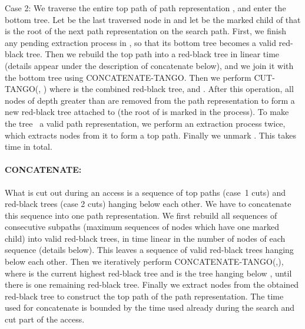 \documentclass[letterpaper,11pt]{article}
\newcommand{\toppath}{top path}
\newcommand{\bottomtree}{bottom tree}
\newcounter{todo}
\newcommand{\todo}[1]{}
\begin{document}
Case 2: We traverse the entire \toppath{} of path representation , and
enter the \bottomtree{}. Let  be the last traversed node in  and let
 be the marked child of  that is the root of the next path
representation on the search path. First, we finish any pending extraction
process in , so that its \bottomtree{} becomes a valid red-black
tree.\todo{This could move  onto the top path, which does not seem
anticipated by the existing phrasing. Hence the changed phrasing. Has
implications for concatenate, see Todo below. Rolf.} Then we rebuild the
\toppath{} into a red-black tree in linear time (details appear under the
description of concatenate below), and we join it with the \bottomtree{}
using C{\scriptsize ONCATENATE}-T{\scriptsize ANGO}.  Then we perform
C{\scriptsize UT}-T{\scriptsize ANGO}(, ) where  is the combined
red-black tree, and . After this operation, all nodes of depth
greater than  are removed from the path representation  to form a new
red-black tree  attached to  (the root of  is marked in the
process). To make the tree~ a valid path representation, we perform an
extraction process twice, which extracts  nodes from it to
form a \toppath. Finally we unmark . This takes  time in
total.


\paragraph{CONCATENATE:}


What is cut out during an access is a sequence of \toppath{}s (case~1 cuts)
and red-black trees (case 2 cuts) hanging below each other. We have to
concatenate this sequence into one path representation. We first rebuild
all sequences of consecutive subpaths (maximum sequences of nodes which
have one marked child) into valid red-black trees, in time linear in the
number of nodes of each sequence (details below). This leaves a sequence of
valid red-black trees hanging below each other. Then we iteratively perform
C{\scriptsize ONCATENATE}-T{\scriptsize ANGO}(,), where  is the
current highest red-black tree and  is the tree hanging below , until
there is one remaining red-black tree. Finally we extract 
nodes from the obtained red-black tree to construct the \toppath{} of the path
representation. The time used for concatenate is bounded by the time used
already during the search and cut part of the access.

\todo{(Rolf)Karim: I here removed the note on efficiency by reusing the toppath,
as this may no longer exists, by the change of Case 2, as mentioned in the
last Todo above. Please check. Rolf.\\
(Karim) I think we still have that the sequence of cut out parts is composed first by
 nodes forming a path. Anyway we will discuss that for the final 
version.}
\end{document}
